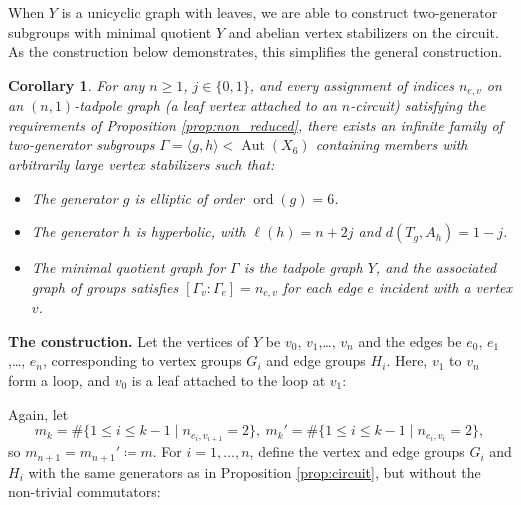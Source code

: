 \documentclass[12pt,leqno]{amsart}
\newcommand{\2}{L^2_{\rm per}(0, T)}
\newtheorem{cor}{Corollary}[section]
\newcommand{\aut}{{\operatorname{Aut}}}
\newcommand{\ord}{{\operatorname{ord}}}
\numberwithin{equation}{section}
\numberwithin{figure}{section}
\begin{document}
When $Y$ is a unicyclic graph with leaves, we are able to construct two-generator subgroups with minimal quotient $Y$ and abelian vertex stabilizers on the circuit. As the construction below demonstrates, this simplifies the general construction.
\begin{cor}\label{thm:tadpole}
    For any $n\geq 1$, $j\in\{0,1\}$, and every assignment of indices $n_{e,v}$ on an $(n,1)$-tadpole graph (a leaf vertex attached to an $n$-circuit) satisfying the requirements of Proposition \ref{prop:non_reduced}, there exists an infinite family of two-generator subgroups $\Gamma = \langle g,h\rangle< \aut(X_6)$ containing members with arbitrarily large vertex stabilizers such that:
    \begin{itemize}
        \item The generator $g$ is elliptic of order $\ord(g)= 6$.
        \item The generator $h$ is hyperbolic, with $\ell(h) = n+2j$ and $d(T_g,A_h) = 1-j$.
        \item The minimal quotient graph for $\Gamma$ is the tadpole graph $Y$, and the associated graph of groups satisfies $[\Gamma_v : \Gamma_e] = n_{e,v}$ for each edge $e$ incident with a vertex $v$.
    \end{itemize}
\end{cor}
\textbf{The construction.} Let the vertices of $Y$ be $v_0$, $v_1$,\dots, $v_n$ and the edges be $e_0$, $e_1$,\dots, $e_n$, corresponding to vertex groups $G_i$ and edge groups $H_i$. Here, $v_1$ to $v_n$ form a loop, and $v_0$ is a leaf attached to the loop at $v_1$:
\begin{center}
\end{center}
Again, let 
\[
m_k = \#\{1\leq i\leq k-1\mid n_{e_i,v_{i+1}} = 2\},\ m_k' = \#\{1\leq i\leq k-1\mid n_{e_i,v_i} = 2\},
\]
so $m_{n+1} = m_{n+1}' \coloneqq m$. For $i=1,\dots, n$, define the vertex and edge groups $G_i$ and $H_i$ with the same generators as in Proposition \ref{prop:circuit}, but without the non-trivial commutators:
\end{document}
